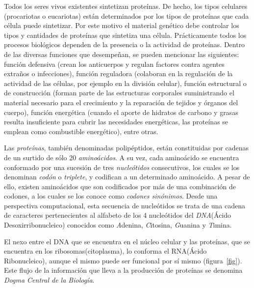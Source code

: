 \par Todos los seres vivos existentes sintetizan proteínas. De hecho, los tipos celulares (procariotas o eucariotas) están determinados por los tipos de proteínas que cada célula puede sintetizar. Por este motivo el material genético debe controlar los tipos y cantidades de proteínas que sintetiza una célula. Prácticamente todos los procesos biológicos dependen de la presencia o la actividad de proteínas. Dentro de las diversas funciones que desempeñan, se pueden mencionar las siguientes: función defensiva (crean los anticuerpos y regulan factores contra agentes extraños o infecciones), función reguladora (colaboran en la regulación de la actividad de las células, por ejemplo en la división celular), función estructural o de construcción (forman parte de las estructuras corporales suministrando el material necesario para el crecimiento y la reparación de tejidos y órganos del cuerpo), función energética (cuando el aporte de hidratos de carbono y grasas resulta insuficiente para cubrir las necesidades energéticas, las proteínas se emplean como combustible energético),  entre otras. 

\par Las \emph{proteínas}, también denominadas polipéptidos, están constituidas por cadenas de un surtido de sólo 20 \emph{aminoácidos}. A su vez, cada aminoácido se encuentra conformado por una sucesión de tres \emph{nucleótidos} consecutivos, los cuales se los denominan \emph{codón} o \emph{triplete}, y codifican a un determinado aminoácido. A pesar de ello, existen aminoácidos que son codificados por más de una combinación de codones, a los cuales se los conoce como \emph{codones sinónimos}. Desde una perspectiva computacional, esta secuencia de nucleótidos se trata de una cadena de caracteres pertenecientes al alfabeto de los 4 nucleótidos del \emph{DNA}(Ácido Desoxirribonucleico) conocidos como \emph{A}denina, \emph{C}itosina, \emph{G}uanina y \emph{T}imina. 

\par El nexo entre el DNA que se encuentra en el núcleo celular y las proteínas, que se encuentra en los ribosomas(citoplasma), lo conforma el RNA(Ácido Ribonucleico), aunque el mismo puede ser funcional por sí mismo (figura~\ref{fig}). Este flujo de la información que lleva a la producción de proteínas se denomina \emph{Dogma Central de la Biología}. 


